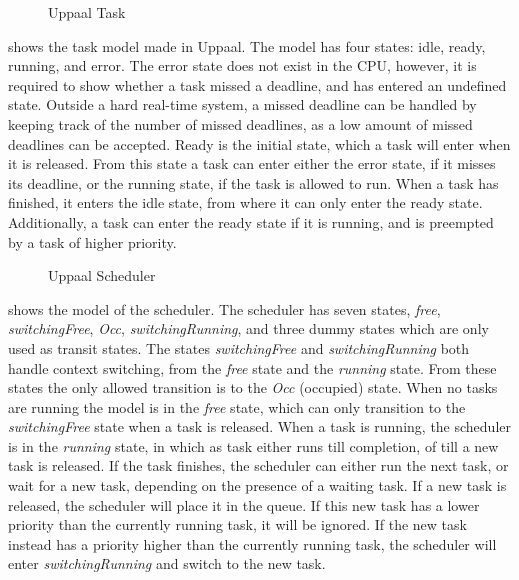 \begin{figure}[H]
\centering
\def\svgwidth{\columnwidth}

\caption{Uppaal Task}
\label{uppaalTask}
\end{figure}
\medskip

 shows the task model made in Uppaal. The model has four states: idle, ready, running, and error. The error state does not exist in the CPU, however, it is required to show whether a task missed a deadline, and has entered an undefined state. Outside a hard real-time system, a missed deadline can be handled by keeping track of the number of missed deadlines, as a low amount of missed deadlines can be accepted. Ready is the initial state, which a task will enter when it is released. From this state a task can enter either the error state, if it misses its deadline, or the running state, if the task is allowed to run. When a task has finished, it enters the idle state, from where it can only enter the ready state. Additionally, a task can enter the ready state if it is running, and is preempted by a task of higher priority. \\

\begin{sidewaysfigure}[p]
\centering
\def\svgwidth{\columnwidth}

\caption{Uppaal Scheduler}
\label{uppaalScheduler}
\end{sidewaysfigure}
\FloatBarrier

 shows the model of the scheduler. The scheduler has seven states, \emph{free}, \emph{switchingFree}, \emph{Occ}, \emph{switchingRunning}, and three dummy states which are only used as transit states. The states \emph{switchingFree} and \emph{switchingRunning} both handle context switching, from the \emph{free} state and the \emph{running} state. From these states the only allowed transition is to the \emph{Occ} (occupied) state. When no tasks are running the model is in the \emph{free} state, which can only transition to the \emph{switchingFree} state when a task is released. When a task is running, the scheduler is in the \emph{running} state, in which as task either runs till completion, of till a new task is released. If the task finishes, the scheduler can either run the next task, or wait for a new task, depending on the presence of a waiting task. If a new task is released, the scheduler will place it in the queue. If this new task has a lower priority than the currently running task, it will be ignored. If the new task instead has a priority higher than the currently running task, the scheduler will enter \emph{switchingRunning} and switch to the new task.

